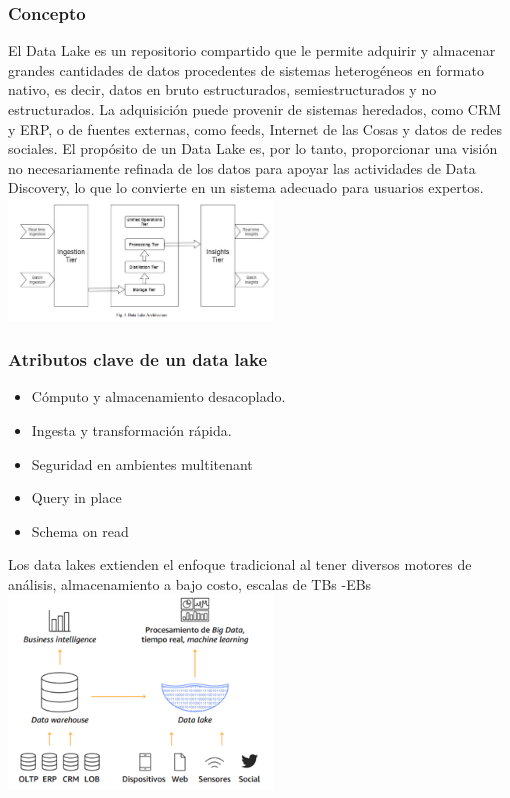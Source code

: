 \documentclass[twoside,twocolumn]{article}
\begin{document}
\subsubsection{Concepto}
El Data Lake es un repositorio compartido que le permite adquirir y almacenar grandes cantidades de datos procedentes de sistemas heterogéneos en formato nativo, es decir, datos en bruto estructurados, semiestructurados y no estructurados. La adquisición puede provenir de sistemas heredados, como CRM y ERP, o de fuentes externas, como feeds, Internet de las Cosas y datos de redes sociales.
El propósito de un Data Lake es, por lo tanto, proporcionar una visión no necesariamente refinada de los datos para apoyar las actividades de Data Discovery, lo que lo convierte en un sistema adecuado para usuarios expertos.
\includegraphics[width=7cm]{imagenes/imagen2.png}
\subsubsection{Atributos clave de un data lake}
\begin{itemize}
    \item  Cómputo y almacenamiento desacoplado.
    \item  Ingesta y transformación rápida.
    \item   Seguridad en ambientes multitenant
    \item   Query in place
    \item  Schema on read
\end{itemize}
Los data lakes extienden el enfoque tradicional al tener diversos motores de análisis, almacenamiento a bajo costo, escalas de TBs -EBs
\includegraphics[width=7cm]{imagenes/imagen3.png}
\end{document}
